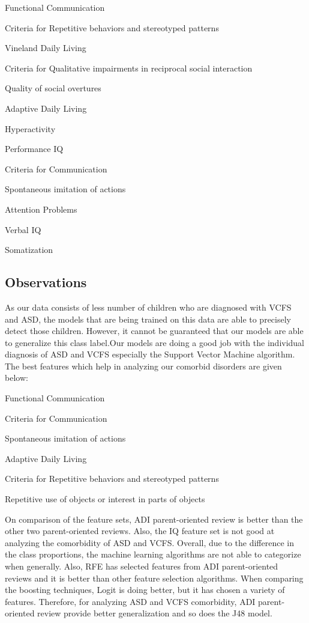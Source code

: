 \begin{compactenum}
\item Functional Communication
\item Criteria for Repetitive behaviors and stereotyped patterns
\item Vineland Daily Living
\item Criteria for Qualitative impairments in reciprocal social interaction
\item Quality of social overtures
\item Adaptive Daily Living
\item Hyperactivity
\item Performance IQ
\item Criteria for Communication
\item Spontaneous imitation of actions
\item Attention Problems
\item Verbal IQ
\item Somatization
\end{compactenum}

\subsection{Observations}
As our data consists of less number of children who are diagnosed with VCFS and ASD, the models that are being trained on this data are able to precisely detect those children. However, it cannot be guaranteed that our models are able to generalize this class label.Our models are doing a good job with the individual diagnosis of ASD and VCFS especially the Support Vector Machine algorithm. The best features which help in analyzing our comorbid disorders are given below:
\begin{compactenum}
\item Functional Communication
\item Criteria for Communication
\item Spontaneous imitation of actions
\item Adaptive Daily Living
\item Criteria for Repetitive behaviors and stereotyped patterns
\item Repetitive use of objects or interest in parts of objects
\end{compactenum}

On comparison of the feature sets, ADI parent-oriented review is better than the other two parent-oriented reviews. Also, the IQ feature set is not good at analyzing the comorbidity of ASD and VCFS. Overall, due to the difference in the class proportions, the machine learning algorithms are not able to categorize when generally. Also, RFE has selected features from ADI parent-oriented reviews and it is better than other feature selection algorithms. When comparing the boosting techniques, Logit is doing better, but it has chosen a variety of features. Therefore, for analyzing ASD and VCFS comorbidity, ADI parent-oriented review provide better generalization and so does the J48 model.